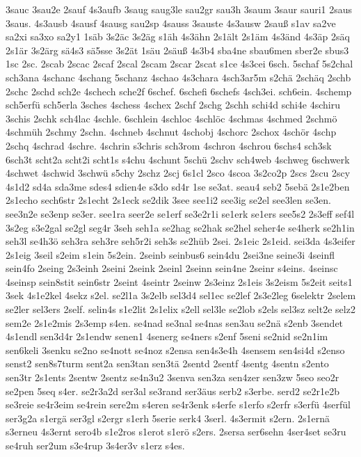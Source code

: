 {3sauc
3sau2e
2sauf
4s3aufb
3saug
saug3le
sau2gr
sau3h
3saum
3saur
sauri1
2saus
3saus.
4s3ausb
4sausf
4sausg
sau2sp
4sauss
3sauste
4s3ausw
2sauß
s1av
sa2ve
sa2xi
sa3xo
sa2y1
1säb
3s2äc
3s2äg
s1äh
4s3ähn
2s1ält
2s1äm
4s3änd
4s3äp
2säq
2s1är
3s2ärg
sä4s3
sä5sse
3s2ät
1säu
2säuß
4s3b4
sba4ne
sbau6men
sber2e
sbus3
1sc
2sc.
2scab
2scac
2scaf
2scal
2scam
2scar
2scat
s1ce
4s3cei
6sch.
5schaf
5s2chal
sch3ana
4schanc
4schang
5schanz
4schao
4s3chara
4sch3ar5m
s2chä
2schäq
2schb
2schc
2schd
sch2e
4schech
sche2f
6schef.
6schefi
6schefs
4sch3ei.
sch6ein.
4schemp
sch5erfü
sch5erla
3sches
4schess
4schex
2schf
2schg
2schh
schi4d
schi4e
4schiru
3schis
2schk
sch4lac
4schle.
6schlein
4schloc
4schlöc
4schmas
4schmed
2schmö
4schmüh
2schmy
2schn.
4schneb
4schnut
4schobj
4schorc
2schox
4schör
4schp
2schq
4schrad
4schre.
4schrin
s3chris
sch3rom
4schron
4schrou
6schs4
sch3sk
6sch3t
scht2a
scht2i
scht1s
s4chu
4schunt
5schü
2schv
sch4web
4schweg
6schwerk
4schwet
4schwid
3schwü
s5chy
2schz
2scj
6s1cl
2sco
4scoa
3s2co2p
2scs
2scu
2scy
4s1d2
sd4a
sda3me
sdes4
sdien4e
s3do
sd4r
1se
se3at.
seau4
seb2
5sebä
2s1e2ben
2s1echo
sech6str
2s1echt
2s1eck
se2dik
3see
see1i2
see3ig
se2el
see3len
se3en.
see3n2e
se3enp
se3er.
see1ra
seer2e
se1erf
se3e2r1i
se1erk
se1ers
see5s2
2s3eff
sef4l
3s2eg
s3e2gal
se2gl
seg4r
3seh
seh1a
se2hag
se2hak
se2hel
seher4e
se4herk
se2h1in
seh3l
se4h3ö
seh3ra
seh3re
seh5r2i
seh3s
se2hüb
2sei.
2s1eic
2s1eid.
sei3da
4s3eifer
2s1eig
3seil
s2eim
s1ein
5s2ein.
2seinb
seinbus6
sein4du
2sei3ne
seine3i
4seinfl
sein4fo
2seing
2s3einh
2seini
2seink
2seinl
2seinn
sein4ne
2seinr
s4eins.
4seinsc
4seinsp
sein8stit
sein6str
2seint
4seintr
2seinw
2s3einz
2s1eis
3s2eism
5s2eit
seits1
3sek
4s1e2kel
4sekz
s2el.
se2l1a
3s2elb
sel3d4
sel1ec
se2lef
2s3e2leg
6selektr
2selem
se2ler
sel3ers
2self.
selin4s
s1e2lit
2s1elix
s2ell
sel3le
se2lob
s2els
sel3sz
selt2e
selz2
sem2e
2s1e2mis
2s3emp
s4en.
se4nad
se3nal
se4nas
sen3au
se2nä
s2enb
3sendet
4s1endl
sen3d4r
2s1endw
senen1
4senerg
se4ners
s2enf
5seni
se2nid
se2n1im
sen6keli
3senku
se2no
se4nott
se4noz
s2ensa
sen4s3e4h
4sensem
sen4si4d
s2enso
senst2
sen8s7turm
sent2a
sen3tan
sen3tä
2sentd
2sentf
4sentg
4sentn
s2ento
sen3tr
2s1ents
2sentw
2sentz
se4n3u2
3senva
sen3za
sen4zer
sen3zw
5seo
seo2r
se2pen
5seq
s4er.
se2r3a2d
ser3al
se3rand
ser3äus
serb2
s3erbe.
serd2
se2r1e2b
se3reie
se4r3eim
se4rein
sere2m
s4eren
se4r3enk
s4erfe
s1erfo
s2erfr
s3erfü
4serfül
ser3g2a
s1ergä
ser3gl
s2ergr
s1erh
5serie
serk4
3serl.
4s3ermit
s2ern.
2s1ernä
s3erneu
4s3ernt
sero4b
s1e2ros
s1erot
s1erö
s2ers.
2sersa
ser6sehn
4ser4set
se3ru
se4ruh
ser2um
s3e4rup
3s4er3v
s1erz
s4es.
}
